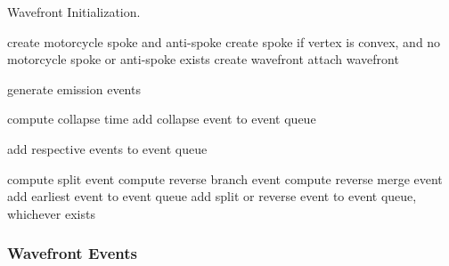 \documentclass[12pt,a4paper,oneside,openany]{article}
\begin{document}
\begin{algorithm}
\caption{Wavefront Initialization.}
\label{alg:wpi}
\begin{algorithmic}
	\State create motorcycle spoke and anti-spoke
\EndFor
{}
	\State create spoke if vertex is convex, and no motorcycle spoke or anti-spoke exists
\EndFor
{}
	\State create wavefront
	\State attach wavefront
\EndFor

\State generate emission events

	\State compute collapse time
	\State add collapse event to event queue
\EndFor

	\State add respective events to event queue
\EndFor

		\State compute split event
	\EndIf
			\State compute reverse branch event
		\EndFor
			\State compute reverse merge event
		\EndIf
	\EndIf
		\State add earliest event to event queue
	\Else
		\State add split or reverse event to event queue, whichever exists
	\EndIf
\EndFor


\end{algorithmic}
\end{algorithm}

\subsubsection{Wavefront Events}
\end{document}
